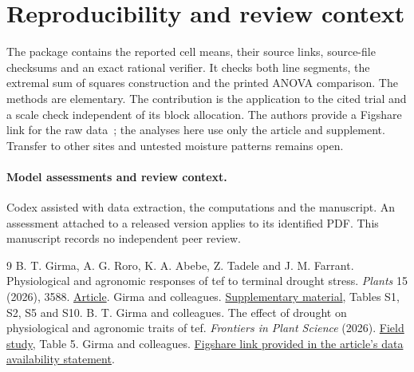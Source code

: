 \documentclass[11pt]{article}
\begin{document}
\section{Reproducibility and review context}
The package contains the reported cell means, their source links, source-file checksums and an exact rational verifier. It checks both line segments, the extremal sum of squares construction and the printed ANOVA comparison. The methods are elementary. The contribution is the application to the cited trial and a scale check independent of its block allocation. The authors provide a Figshare link for the raw data~\cite{data}; the analyses here use only the article and supplement. Transfer to other sites and untested moisture patterns remains open.

\paragraph{Model assessments and review context.} Codex assisted with data extraction, the computations and the manuscript. An assessment attached to a released version applies to its identified PDF. This manuscript records no independent peer review.

\begin{thebibliography}{9}
 B. T. Girma, A. G. Roro, K. A. Abebe, Z. Tadele and J. M. Farrant. Physiological and agronomic responses of tef to terminal drought stress. \emph{Plants} 15 (2026), 3588. \href{https://doi.org/10.3390/plants15223588}{Article}.
 Girma and colleagues. \href{https://mdpi-res.com/d_attachment/plants/plants-15-03588/article_deploy/plants-15-03588-s001.zip}{Supplementary material}, Tables S1, S2, S5 and S10.
 B. T. Girma and colleagues. The effect of drought on physiological and agronomic traits of tef. \emph{Frontiers in Plant Science} (2026). \href{https://doi.org/10.3389/fpls.2026.1880325}{Field study}, Table 5.
 Girma and colleagues. \href{https://figshare.com/s/0568883f232686727719}{Figshare link provided in the article's data availability statement}.
\end{thebibliography}
\end{document}
